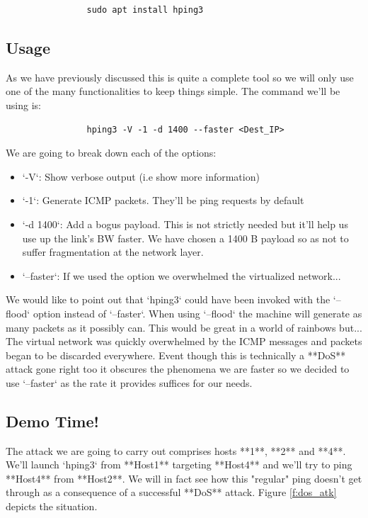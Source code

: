 \documentclass[12pt]{report}
\begin{document}
			\begin{verbatim}
				sudo apt install hping3
			\end{verbatim}

		\subsection{Usage}
			As we have previously discussed this is quite a complete tool so we will only use one of the many functionalities to keep things simple. The command we'll be using is:

			\begin{verbatim}
				hping3 -V -1 -d 1400 --faster <Dest_IP>
			\end{verbatim}

			We are going to break down each of the options:

			\begin{itemize}
				\item `-V`: Show verbose output (i.e show more information)
				\item `-1`: Generate ICMP packets. They'll be ping requests by default
				\item `-d 1400`: Add a bogus payload. This is not strictly needed but it'll help us use up the link's BW faster. We have chosen a 1400 B payload so as not to suffer fragmentation at the network layer.
				\item `--faster`: If we used the  option we overwhelmed the virtualized network...
			\end{itemize}

			We would like to point out that `hping3` could have been invoked with the `--flood` option instead of `--faster`. When using `--flood` the machine will generate as many packets as it possibly can. This would be great in a world of rainbows but... The virtual network was quickly overwhelmed by the ICMP messages and packets began to be discarded everywhere. Event though this is technically a **DoS** attack gone right too it obscures the phenomena we are faster so we decided to use `--faster` as the rate it provides suffices for our needs.

		\subsection{Demo Time!}
			The attack we are going to carry out comprises hosts **1**, **2** and **4**. We'll launch `hping3` from **Host1** targeting **Host4** and we'll try to ping **Host4** from **Host2**. We will in fact see how this "regular" ping doesn't get through as a consequence of a successful **DoS** attack. Figure \ref{f:dos_atk} depicts the situation.
\end{document}
